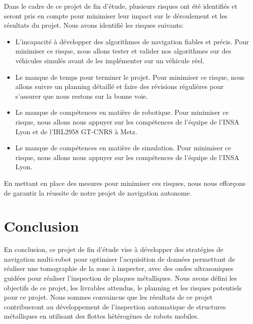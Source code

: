\documentclass[init,francais,RandD]{rapportPFE}  %
\begin{document}
		Dans le cadre de ce projet de fin d'étude, plusieurs risques ont été identifiés et seront pris en compte pour minimiser leur impact sur le déroulement et les résultats du projet. Nous avons identifié les risques suivants:
		\begin{itemize}
			\item L'incapacité à développer des algorithmes de navigation fiables et précis. Pour minimiser ce risque, nous allons tester et valider nos algorithmes sur des véhicules simulés avant de les implémenter sur un véhicule réel.
			\item Le manque de temps pour terminer le projet. Pour minimiser ce risque, nous allons suivre un planning détaillé et faire des révisions régulières pour s'assurer que nous restons sur la bonne voie.
			\item Le manque de compétences en matière de robotique. Pour minimiser ce risque, nous allons nous appuyer sur les compétences de l'équipe de l'INSA Lyon et de l'IRL2958 GT-CNRS à Metz.
			\item Le manque de compétences en matière de simulation. Pour minimiser ce risque, nous allons nous appuyer sur les compétences de l'équipe de l'INSA Lyon.
		\end{itemize}
		En mettant en place des mesures pour minimiser ces risques, nous nous efforçons de garantir la réussite de notre projet de navigation autonome.
	\section{Conclusion}
		En conclusion, ce projet de fin d'étude vise à développer des stratégies de navigation multi-robot pour optimiser l'acquisition de données permettant de réaliser une tomographie de la zone à inspecter, avec des ondes ultrasoniques guidées pour réaliser l'inspection de plaques métalliques. Nous avons défini les objectifs de ce projet, les livrables attendus, le planning et les risques potentiels pour ce projet. Nous sommes convaincus que les résultats de ce projet contribueront au développement de l'inspection automatique de structures métalliques en utilisant des flottes hétérogènes de robots mobiles.
\end{document}
